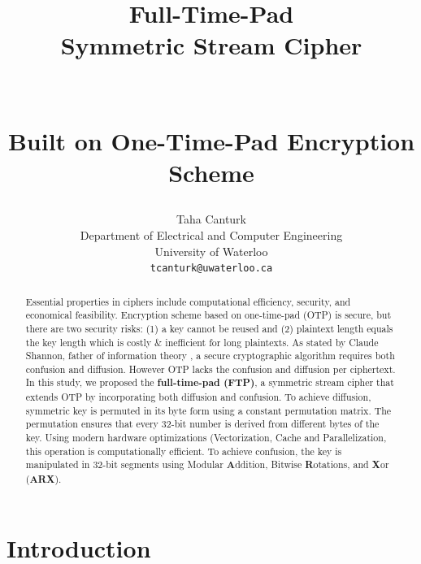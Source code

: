 \documentclass[11pt]{article}
\title {
	\Huge \textbf{Full-Time-Pad\\Symmetric Stream Cipher} \\
	\ \\
	\ \\
	\Large \textbf{Built on One-Time-Pad Encryption Scheme}

}
\author{
Taha Canturk \\
Department of Electrical and Computer Engineering \\
University of Waterloo \\
\texttt{tcanturk@uwaterloo.ca}
}
\date{} %
\theoremstyle{definition}
\theoremstyle{remark}
\begin{document}
\maketitle


\begin{abstract}
	Essential properties in ciphers include computational efficiency, security, and economical feasibility. Encryption scheme based on one-time-pad (OTP) is secure, but there are two security risks: (1) a key cannot be reused and (2) plaintext length equals the key length which is costly \& inefficient for long plaintexts. As stated by Claude Shannon, father of information theory \cite{shannon1945}, a secure cryptographic algorithm requires both confusion and diffusion. However OTP lacks the confusion and diffusion per ciphertext.
	In this study, we proposed the \textbf{full-time-pad (FTP)}, a symmetric stream cipher that extends OTP by incorporating both diffusion and confusion.
	To achieve diffusion, symmetric key is permuted in its byte form using a constant permutation matrix. The permutation ensures that every 32-bit number is derived from different bytes of the key.
	Using modern hardware optimizations (Vectorization, Cache and Parallelization, this operation is computationally efficient.
	To achieve confusion, the key is manipulated in 32-bit segments using Modular \textbf{A}ddition, Bitwise \textbf{R}otations, and \textbf{X}or (\textbf{ARX}).
\end{abstract}
\newpage

\tableofcontents

\newpage


\section{Introduction}
\end{document}
